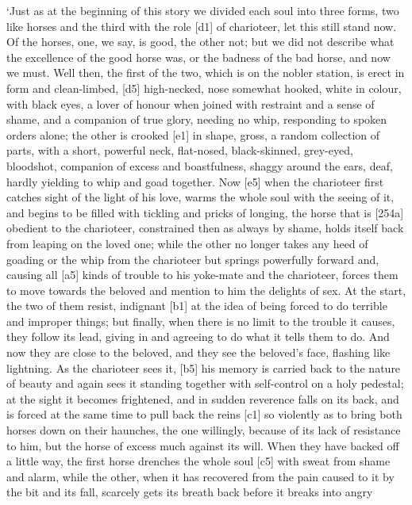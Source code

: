 ‘Just as at the beginning of this story we divided each soul into three
forms, two like horses
and the third with the role {[}d1{]} of charioteer, let this still stand
now. Of the horses, one, we say, is good, the other not; but we did not
describe what the excellence of the good horse was, or the badness of
the bad horse, and now we must. Well then, the first of the two, which
is on the nobler
station, is erect in
form and clean-limbed, {[}d5{]} high-necked, nose somewhat hooked, white
in colour, with black eyes, a lover of honour when joined with restraint
and a sense of shame, and a companion of true glory, needing no whip,
responding to spoken
orders alone; the other
is crooked {[}e1{]} in shape, gross, a random collection of parts, with
a short, powerful neck, flat-nosed, black-skinned, grey-eyed, bloodshot,
companion of excess and
boastfulness, shaggy around the ears, deaf, hardly yielding to whip and
goad together. Now {[}e5{]} when the charioteer first catches sight of
the light of his love, warms the whole soul with the seeing of it, and
begins to be filled with tickling and pricks of longing, the horse that
is {[}254a{]} obedient to the charioteer, constrained then as always by
shame, holds itself back from leaping on the loved one; while the other
no longer takes any heed of goading or the whip from the charioteer but
springs powerfully forward and, causing all {[}a5{]} kinds of trouble to
his yoke-mate and the charioteer, forces them to move towards the
beloved and mention to him the delights of sex. At the start, the two of
them resist, indignant {[}b1{]} at the idea of being forced to do
terrible and improper things; but finally, when there is no limit to the
trouble it causes, they follow its lead, giving in and agreeing to do
what it tells them to do. And now they are close to the beloved, and
they see the beloved's face, flashing like lightning. As the charioteer
sees it, {[}b5{]} his memory is carried back to the nature of beauty and
again sees it standing together with self-control on a holy pedestal; at
the sight it becomes frightened, and in sudden reverence falls on its
back, and is forced at the same time to pull back the reins {[}c1{]} so
violently as to bring both horses down on their haunches, the one
willingly, because of its lack of resistance to him, but the horse of
excess much against its
will. When they have backed off a little way, the first horse drenches
the whole soul {[}c5{]} with sweat from shame and alarm, while the
other, when it has recovered from the pain caused to it by the bit and
its fall, scarcely gets its breath back before it breaks into angry
